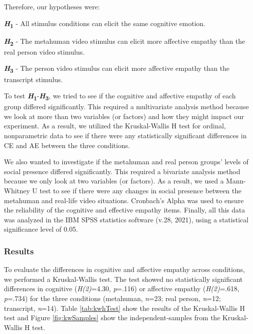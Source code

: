 Therefore, our hypotheses were:

\textbf{\textit{H}\textsubscript{1}} - All stimulus conditions can elicit the same cognitive emotion.

\textbf{\textit{H}\textsubscript{2}} - The metahuman video stimulus can elicit more affective empathy than the real person video stimulus.

\textbf{\textit{H}\textsubscript{3}} - The person video stimulus can elicit more affective empathy than the transcript stimulus.

To test \textbf{\textit{H}\textsubscript{1}}-\textbf{\textit{H}\textsubscript{3}}, we tried to see if the cognitive and affective empathy of each group differed significantly. This required a multivariate analysis method because we look at more than two variables (or factors) and how they might impact our experiment. As a result, we utilized the Kruskal-Wallis H test for ordinal, nonparametric data to see if there were any statistically significant differences in CE and AE between the three conditions.

We also wanted to investigate if the metahuman and real person groups' levels of social presence differed significantly. This required a bivariate analysis method because we only look at two variables (or factors). As a result, we used a Mann-Whitney U test to see if there were any changes in social presence between the metahuman and real-life video situations. Cronbach's Alpha was used to ensure the reliability of the cognitive and effective empathy items. Finally, all this data was analyzed in the IBM SPSS statistics software (v.28, 2021), using a statistical significance level of 0.05.

\subsubsection{Results}
To evaluate the differences in cognitive and affective empathy across conditions, we performed a Kruskal-Wallis test. The test showed no statistically significant differences in cognitive (\textit{H(2)}=4.30, \textit{p}=.116) or affective empathy (\textit{H(2)}=.618, \textit{p}=.734) for the three conditions (metahuman, \textit{n}=23; real person, \textit{n}=12; transcript, \textit{n}=14). Table \ref{tab:kwhTest} show the results of the Kruskal-Wallis H test and Figure \ref{fig:kwSamples} show the independent-samples from the Kruskal-Wallis H test.

